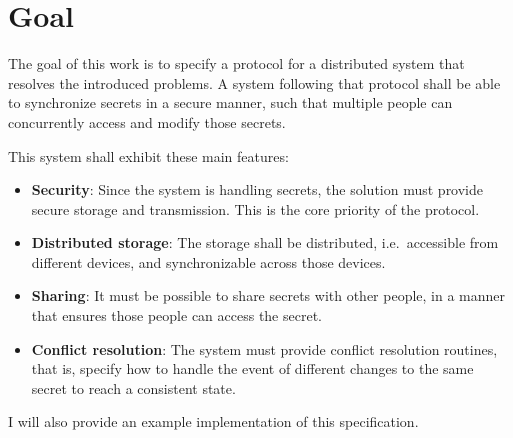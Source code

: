 \section{Goal}

The goal of this work is to specify a protocol for a distributed system that
resolves the introduced problems. A system following that protocol shall be
able to synchronize secrets in a secure manner, such that multiple people can
concurrently access and modify those secrets.

This system shall exhibit these main features:

\begin{itemize}
    \item \textbf{Security}: Since the system is handling secrets, the solution
        must provide secure storage and transmission. This is the core priority
        of the protocol.

    \item \textbf{Distributed storage}: The storage shall be distributed, i.e.\ 
        accessible from different devices, and synchronizable across those
        devices. 

    \item \textbf{Sharing}: It must be possible to share secrets with other
        people, in a manner that ensures those people can access the secret.
        
    \item \textbf{Conflict resolution}: The system must provide conflict
        resolution routines, that is, specify how to handle the event of
        different changes to the same secret to reach a consistent state.

\end{itemize}

I will also provide an example implementation of this specification.
